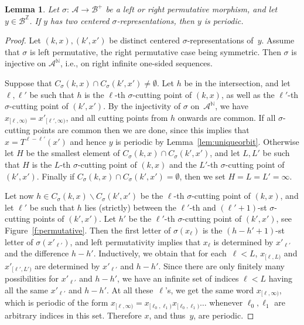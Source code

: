 \documentclass{amsart}
\newtheorem{lemma}{Lemma}[section]
\theoremstyle{definition}
\theoremstyle{remark}
\numberwithin{equation}{section}
\begin{document}
\begin{lemma} \label{l:permutative}
Let $\sigma:\, \mathcal{A} \to \mathcal{B}^+$ be a left or right permutative morphism, and let $y \in \mathcal{B}^\mathbb{Z}$. 
If $y$ has two centered $\sigma$-representations, then $y$ is periodic. 
\end{lemma}

\begin{proof}
Let $(k,x), (k',x')$ be distinct centered $\sigma$-representations of~$y$. 
Assume that $\sigma$ is left permutative, the right permutative case being symmetric.
Then $\sigma$ is injective on $\mathcal{A}^\mathbb{N}$, i.e., on right infinite one-sided sequences.

Suppose that $C_\sigma(k,x) \cap C_\sigma(k',x') \ne \emptyset$. 
Let $ h$ be in the intersection, and let $ \ell,\ell'$ be such that $ h$ is the $\ell$-th $\sigma$-cutting point of $(k,x)$, as well as the $\ell'$-th $\sigma$-cutting point of $(k',x')$.
By the injectivity of $\sigma$ on~$\mathcal{A}^\mathbb{N}$, we have $x_{[ \ell,\infty)} = x'_{[ \ell',\infty)}$, and all cutting points from $ h$ onwards are common. 
If all $\sigma$-cutting points are common then we are done, since this implies that $x = T^{\ell- \ell'}(x')$ and hence $y$ is periodic by Lemma~\ref{lem:uniqueorbit}. Otherwise let $H$ be the smallest element of $C_\sigma(k,x) \cap C_\sigma(k',x')$, and 
let $L,L'$  be such that $H$ is  the $L$-th $\sigma$-cutting point of $(k,x)$ and the $L'$-th $\sigma$-cutting point of $(k',x')$.
Finally if $C_\sigma(k,x) \cap C_\sigma(k',x') = \emptyset$, then we set $H = L = L' = \infty$. 

Let now $h   \in C_\sigma(k,x) \backslash C_\sigma(k',x') $ be the $\ell$-th $\sigma$-cutting point of $(k,x)$, and let $\ell'$ be such that $h$ lies (strictly) between the $\ell'$-th and $(\ell'{+}1)$-st $\sigma$-cutting points of $(k',x')$.
Let $h'$ be the $\ell'$-th $\sigma$-cutting point of $(k',x')$, see Figure~\ref{f:permutative}.
Then the first letter of $\sigma(x_\ell)$ is the $(h{-}h'{+}1)$-st letter of $\sigma(x'_{\ell'})$, and left permutativity implies that $x_\ell$ is determined by $x'_{\ell'}$ and the difference $h-h'$. 
Inductively, we obtain that for each~$\ell<L$, $x_{[\ell,L)}$ and $x'_{[\ell',L')}$ are determined by $x'_{\ell'}$ and $h-h'$.
Since there are only finitely many possibilities for $x'_{\ell'}$ and $h-h'$, we have an infinite set of indices $\ell < L$ having all the same $x'_{\ell'}$ and $h-h'$. 
At all these~$\ell$'s, we get the same word $x_{[\ell,\infty)}$, which is periodic of the form  $x_{[\ell,\infty)} = x_{[\ell_0,\ell_1)}  x_{[\ell_0,\ell_1)} \ldots$ whenever $\ell_0, \ell_1$ are arbitrary indices in this set. 
Therefore $x$, and thus~$y$, are periodic.
\end{proof}
\end{document}
